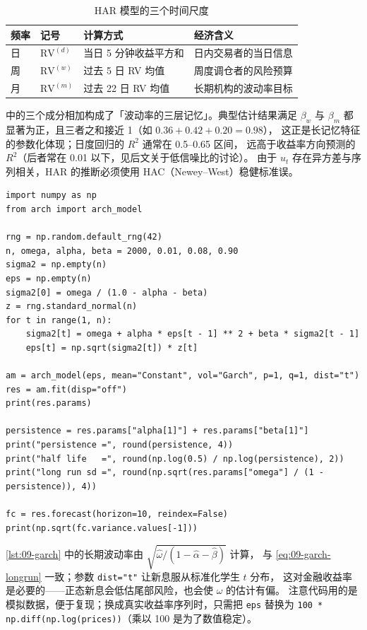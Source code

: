 \begin{table}[htbp]
\centering
\caption{HAR 模型的三个时间尺度}\label{tab:09-har}
\tablefont
\begin{tabular}{@{}llll@{}}
\toprule
频率 & 记号 & 计算方式 & 经济含义 \\
\midrule
日 & $\mathrm{RV}^{(d)}$ & 当日 5 分钟收益平方和 & 日内交易者的当日信息 \\
周 & $\mathrm{RV}^{(w)}$ & 过去 5 日 RV 均值 & 周度调仓者的风险预算 \\
月 & $\mathrm{RV}^{(m)}$ & 过去 22 日 RV 均值 & 长期机构的波动率目标 \\
\bottomrule
\end{tabular}
\end{table}

 中的三个成分相加构成了「波动率的三层记忆」。典型估计结果满足
$\beta_w$ 与 $\beta_m$ 都显著为正，且三者之和接近 1（如 $0.36+0.42+0.20=0.98$），
这正是长记忆特征的参数化体现；日度回归的 $R^2$ 通常在 0.5--0.65 区间，
远高于收益率方向预测的 $R^2$（后者常在 0.01 以下，见后文关于低信噪比的讨论）。
由于 $u_t$ 存在异方差与序列相关，HAR 的推断必须使用 HAC（Newey--West）稳健标准误。

\begin{lstlisting}[style=pythonstyle,
                   caption={用 \texttt{arch} 拟合 GARCH(1,1) 并做波动率预测},
                   label={lst:09-garch}]
import numpy as np
from arch import arch_model

rng = np.random.default_rng(42)
n, omega, alpha, beta = 2000, 0.01, 0.08, 0.90
sigma2 = np.empty(n)
eps = np.empty(n)
sigma2[0] = omega / (1.0 - alpha - beta)
z = rng.standard_normal(n)
for t in range(1, n):
    sigma2[t] = omega + alpha * eps[t - 1] ** 2 + beta * sigma2[t - 1]
    eps[t] = np.sqrt(sigma2[t]) * z[t]

am = arch_model(eps, mean="Constant", vol="Garch", p=1, q=1, dist="t")
res = am.fit(disp="off")
print(res.params)

persistence = res.params["alpha[1]"] + res.params["beta[1]"]
print("persistence =", round(persistence, 4))
print("half life   =", round(np.log(0.5) / np.log(persistence), 2))
print("long run sd =", round(np.sqrt(res.params["omega"] / (1 - persistence)), 4))

fc = res.forecast(horizon=10, reindex=False)
print(np.sqrt(fc.variance.values[-1]))
\end{lstlisting}

\cref{lst:09-garch} 中的长期波动率由 $\sqrt{\hat\omega/(1-\hat\alpha-\hat\beta)}$ 计算，
与 \cref{eq:09-garch-longrun} 一致；参数 \texttt{dist="t"} 让新息服从标准化学生 $t$ 分布，
这对金融收益率是必要的——正态新息会低估尾部风险，也会使 $\omega$ 的估计有偏。
注意代码用的是模拟数据，便于复现；换成真实收益率序列时，只需把 \texttt{eps} 替换为
\texttt{100 * np.diff(np.log(prices))}（乘以 100 是为了数值稳定）。

